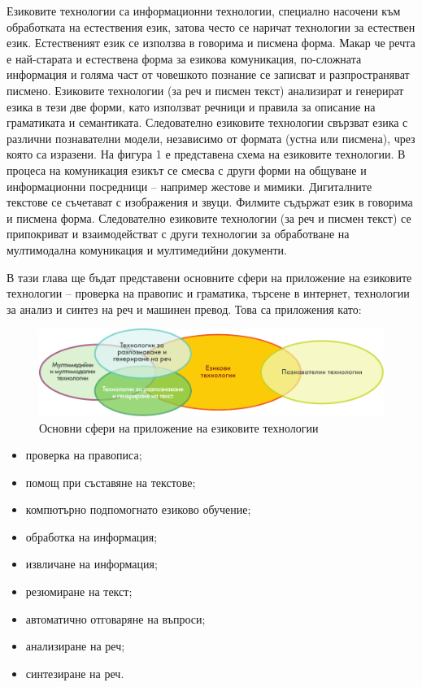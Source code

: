 \documentclass[]{../../metanetpaper}
\begin{document}
\begin{multicols}{2}

Езиковите технологии са информационни технологии, специално насочени към обработката на естествения език, затова често се наричат технологии за естествен език. Естественият език се използва в говорима и писмена форма. Макар че речта е най-старата и естествена форма за езикова комуникация, по-сложната информация и голяма част от човешкото познание се записват и разпространяват писмено. Езиковите технологии (за реч и писмен текст) анализират и генерират езика в тези две форми, като използват речници и правила за описание на граматиката и семантиката. Следователно езиковите технологии свързват езика с различни познавателни модели, независимо от формата (устна или писмена), чрез която са изразени.
На фигура 1 е представена схема на езиковите технологии. В процеса на комуникация езикът се смесва с други форми на общуване и информационни посредници -- например жестове и мимики. Дигиталните текстове се съчетават с изображения и звуци. Филмите съдържат език в говорима и писмена форма. Следователно езиковите технологии (за реч и писмен текст) се припокриват и взаимодействат с други технологии за  обработване на мултимодална комуникация и мултимедийни документи. 

В тази глава  ще бъдат представени основните сфери на приложение на
езиковите технологии -- проверка на правопис и граматика, търсене в
интернет, технологии за анализ и синтез на реч и машинен превод. Това
са приложения като: 

\begin{figure}[htb]
  \center
  \includegraphics[width=\textwidth]{../_media/bulgarian/language_technologies}
  \caption{Основни сфери на приложение на езиковите технологии}
  \label{fig:ltincontext_de}
\end{figure}

\begin{itemize}
\item проверка на правописа;
\item помощ при съставяне на текстове;
\item компютърно подпомогнато езиково обучение;
\item обработка на информация;
\item извличане на информация;
\item резюмиране на текст;
\item автоматично отговаряне на въпроси;
\item анализиране на реч;
\item синтезиране на реч.
\end{itemize}


\end{multicols}
\end{document}
